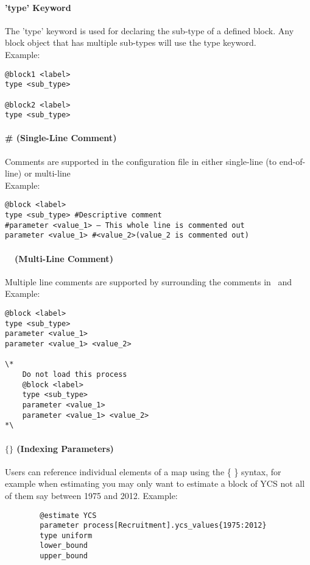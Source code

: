 \paragraph*{'type' Keyword}
The 'type' keyword is used for declaring the sub-type of a defined block. Any block object that has multiple sub-types will use the type keyword.\\
Example:
{\small{\begin{verbatim}
@block1 <label>
type <sub_type>

@block2 <label>
type <sub_type>
\end{verbatim}}}

\paragraph*{\# (Single-Line Comment)}
Comments are supported in the configuration file in either single-line (to end-of-line) or multi-line\\
Example:
{\small{\begin{verbatim}
@block <label>
type <sub_type> #Descriptive comment
#parameter <value_1> – This whole line is commented out
parameter <value_1> #<value_2>(value_2 is commented out)
\end{verbatim}}}

\paragraph*{\commentstart\ \commentend\ (Multi-Line Comment)}
Multiple line comments are supported by surrounding the comments in \commentstart\ and \commentend\\
Example:
{\small{\begin{verbatim}
@block <label>
type <sub_type>
parameter <value_1>
parameter <value_1> <value_2>

\* 
	Do not load this process
	@block <label>
	type <sub_type>
	parameter <value_1>
	parameter <value_1> <value_2>
*\
\end{verbatim}}}

\paragraph*{$\{ \}$ (Indexing Parameters)}

Users can reference individual elements of a map using the \{ \} syntax, for example when estimating  you may only want to estimate a block of YCS not all of them say between 1975 and 2012.
Example:
{\small{\begin{verbatim}
		@estimate YCS
		parameter process[Recruitment].ycs_values{1975:2012}
		type uniform
		lower_bound
		upper_bound
		\end{verbatim}}}
	
